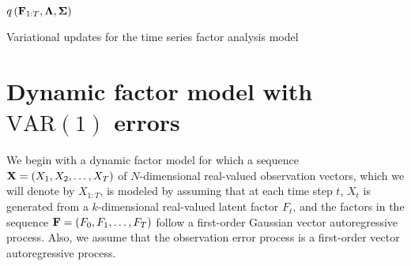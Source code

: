 \begin{algorithm}[H]
	\SetAlgoLined
	\DontPrintSemicolon
  	\Return $q \left( {\bf F}_{1:T}, {\bm \Lambda}, {\bm \Sigma} \right)$ \;
 	\caption{Variational updates for the time series factor analysis model}
\end{algorithm}

\section{Dynamic factor model with $\text{VAR}(1)$ errors}
We begin with a dynamic factor model for which a sequence ${\bf X} = \left( X_1, X_2, \ldots, X_T \right)$ of $N$-dimensional real-valued observation vectors, which we will denote by $X_{1:T}$, is modeled by assuming that at each time step $t$, $X_t$ is generated from a $k$-dimensional real-valued latent factor $F_t$, and the factors in the sequence ${\bf F} = \left( F_0, F_1, \ldots, F_T \right)$ follow a first-order Gaussian  vector autoregressive process. Also, we assume that the observation error process is a first-order vector autoregressive process. 


